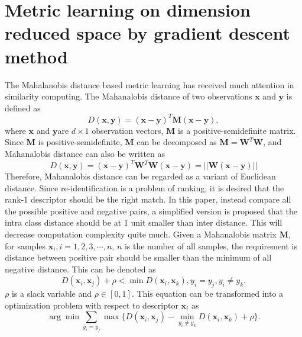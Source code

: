 \documentclass[conference,compsoc]{IEEEtran}
\begin{document}
\section{Metric learning on dimension reduced space by gradient descent method}
The Mahalanobis distance based metric learning has received much attention in similarity computing. The Mahanalobis distance of two observations $\bm{x} $ and $\bm{y}$ is defined as
\begin{equation}
D(\bm{x},\bm{y}) = (\bm{x} - \bm{y})^T\bm{M}(\bm{x} - \bm{y}), 
\end{equation}
where $\bm{x}$ and $\bm{y} $are $d\times1$ observation vectors, $\bm{M}$ is a positive-semidefinite matrix. Since $\bm{M}$ is positive-semidefinite, $\bm{M}$ can be decomposed as $\bm{M} = \bm{W}^T\bm{W}$, and Mahanalobis distance can also be written as 
\begin{equation}
D(\bm{x},\bm{y}) = (\bm{x} - \bm{y})^T\bm{W}^T\bm{W}(\bm{x} - \bm{y})= ||\bm{W}(\bm{x} - \bm{y})||
\end{equation}
 Therefore, Mahanalobis distance can be regarded as a variant of Euclidean distance. 
Since re-identification is a problem of ranking, it is desired that the rank-1 descriptor should be the right match. In this paper, instead compare all the possible positive and negative pairs, a simplified version is proposed that the intra class distance should be at 1 unit smaller than inter distance. This will decrease computation complexity quite much. Given a Mahanalobis matrix $\bm{M}$, for samples $\bm{x}_i, i = 1,2,3,\cdots,n$, $n$ is the number of all samples, the requirement is distance between positive pair should be smaller than the minimum of all negative distance. This can be denoted as 
 \begin{equation}
 D(\bm{x}_i,\bm{x}_j) + \rho < \min D(\bm{x}_i,\bm{x}_k), y_i = y_j, y_i\ne y_k.
 \end{equation}
 $\rho$ is a slack variable and $\rho \in [0,1]$. This equation can be transformed into a optimization problem with respect to descriptor $\bm{x}_i$ as
 \begin{equation}
 \arg \min \sum_{y_i = y_j} \max \{D(\bm{x}_i,\bm{x}_j) -  \min_{ y_i\ne y_k} D(\bm{x}_i,\bm{x}_k)  + \rho \}.
 \end{equation}
 
\end{document}
